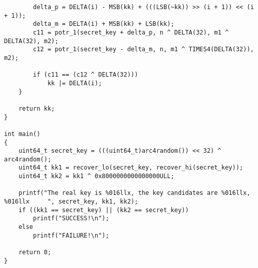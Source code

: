 \begin{verbatim}
		delta_p = DELTA(i) - MSB(kk) + (((LSB(~kk)) >> (i + 1)) << (i + 1));
		delta_m = DELTA(i) + MSB(kk) + LSB(kk);
		c11 = potr_1(secret_key + delta_p, n ^ DELTA(32), m1 ^ DELTA(32), m2);
		c12 = potr_1(secret_key - delta_m, n, m1 ^ TIMES4(DELTA(32)), m2);

		if (c11 == (c12 ^ DELTA(32)))
			kk |= DELTA(i);
	}

	return kk;
}

int main()
{
	uint64_t secret_key = (((uint64_t)arc4random()) << 32) ^ arc4random();
	uint64_t kk1 = recover_lo(secret_key, recover_hi(secret_key));
	uint64_t kk2 = kk1 ^ 0x8000000000000000ULL;

	printf("The real key is %016llx, the key candidates are %016llx, %016llx     ", secret_key, kk1, kk2);
	if ((kk1 == secret_key) || (kk2 == secret_key))
		printf("SUCCESS!\n");
	else
		printf("FAILURE!\n");

	return 0;
}
\end{verbatim}
